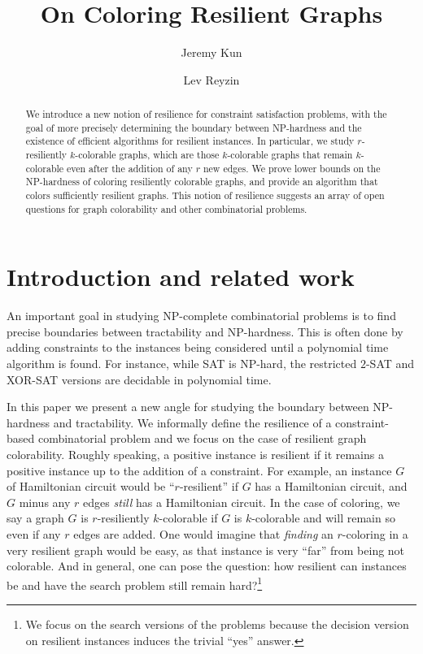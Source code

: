 \documentclass{llncs}
\title{On Coloring Resilient Graphs}
\author{Jeremy Kun \and Lev Reyzin}
\institute{
Department of Mathematics, Statistics, and Computer Science\\
University of Illinois at Chicago\\
Chicago, IL 60607\\
\texttt{\{jkun2,lreyzin\}@math.uic.edu}
}
\date{}
\begin{document}
\maketitle

\begin{abstract} 
We introduce a new notion of resilience for constraint satisfaction problems,
with the goal of more precisely determining the boundary between NP-hardness
and the existence of efficient algorithms for resilient instances.  In
particular, we study $r$-resiliently $k$-colorable graphs, which are those
$k$-colorable graphs that remain $k$-colorable even after the addition of any
$r$ new edges.  We prove lower bounds on the NP-hardness of coloring
resiliently colorable graphs, and provide an algorithm that colors sufficiently
resilient graphs. This notion of resilience suggests an array of open
questions for graph colorability and other combinatorial problems.
\end{abstract}

\section{Introduction and related work}

An important goal in studying NP-complete combinatorial problems is to find
precise boundaries between tractability and NP-hardness. This is often done by
adding constraints to the instances being considered until a polynomial time
algorithm is found.  For instance, while SAT is NP-hard, the restricted $2$-SAT
and XOR-SAT versions are decidable in polynomial time.  

In this paper we present a new angle for studying the boundary between NP-hardness
and tractability.
We informally define the resilience of a constraint-based combinatorial problem
and we focus on the case of resilient graph colorability. Roughly speaking, a
positive instance is resilient if it remains a positive instance up to the
addition of a constraint. For example, an instance $G$ of Hamiltonian circuit
would be ``$r$-resilient'' if $G$ has a Hamiltonian circuit, and $G$ minus any
$r$ edges \emph{still} has a Hamiltonian circuit. In the case of coloring, we
say a graph $G$ is $r$-resiliently $k$-colorable if $G$ is $k$-colorable and
will remain so even if any $r$ edges are added. One would imagine that
\emph{finding} an $r$-coloring in a very resilient graph would be easy, as that
instance is very ``far'' from being not colorable.  And in general, one can
pose the question: how resilient can instances be and have the search problem
still remain hard?\footnote{We focus on the search versions of the problems
because the decision version on resilient instances induces the trivial ``yes''
answer.}
\end{document}
